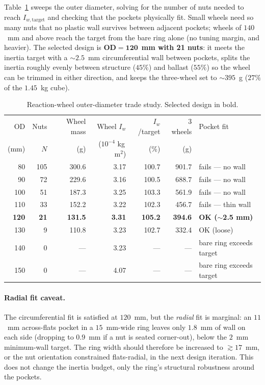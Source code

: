 Table~\ref{tab:rw_sizing} sweeps the outer diameter, solving for the number of
nuts needed to reach $I_{w,\text{target}}$ and checking that the pockets
physically fit. Small wheels need so many nuts that no plastic wall survives
between adjacent pockets; wheels of $140$~mm and above reach the target from the
bare ring alone (no tuning margin, and heavier). The selected design is
$\mathbf{OD = 120}$~\textbf{mm with 21 nuts}: it meets the inertia target with a
$\sim\!2.5$~mm circumferential wall between pockets, splits the inertia roughly
evenly between structure ($45\%$) and ballast ($55\%$) so the wheel can be
trimmed in either direction, and keeps the three-wheel set to $\sim\!395$~g
($27\%$ of the $1.45$~kg cube).

\begin{table}[h]
\centering
\caption{Reaction-wheel outer-diameter trade study. Selected design in bold.}
\label{tab:rw_sizing}
\small
\setlength{\tabcolsep}{4pt}
\begin{tabular}{rrrrrrl}
\toprule
OD & Nuts & Wheel mass & Wheel $I_w$ & $I_w$/target & 3 wheels & Pocket fit \\
(mm) & $N$ & (g) & ($10^{-4}$ kg\,m$^2$) & (\%) & (g) & \\
\midrule
80  & 105 & 300.6 & 3.17 & 100.7 & 901.7 & fails --- no wall \\
90  & 72  & 229.6 & 3.16 & 100.5 & 688.7 & fails --- no wall \\
100 & 51  & 187.3 & 3.25 & 103.3 & 561.9 & fails --- no wall \\
110 & 33  & 152.2 & 3.22 & 102.3 & 456.7 & fails --- thin wall \\
\textbf{120} & \textbf{21} & \textbf{131.5} & \textbf{3.31} & \textbf{105.2} & \textbf{394.6} & \textbf{OK ($\sim$2.5 mm)} \\
130 & 9   & 110.8 & 3.23 & 102.7 & 332.4 & OK (loose) \\
140 & 0   & ---   & 3.23 & ---   & ---   & bare ring exceeds target \\
150 & 0   & ---   & 4.07 & ---   & ---   & bare ring exceeds target \\
\bottomrule
\end{tabular}
\end{table}

\paragraph{Radial fit caveat.} The circumferential fit is satisfied at
$120$~mm, but the \emph{radial} fit is marginal: an $11$~mm across-flats pocket
in a $15$~mm-wide ring leaves only $1.8$~mm of wall on each side (dropping to
$0.9$~mm if a nut is seated corner-out), below the $2$~mm minimum-wall target.
The ring width should therefore be increased to $\gtrsim\!17$~mm, or the nut
orientation constrained flats-radial, in the next design iteration. This does
not change the inertia budget, only the ring's structural robustness around the
pockets.

